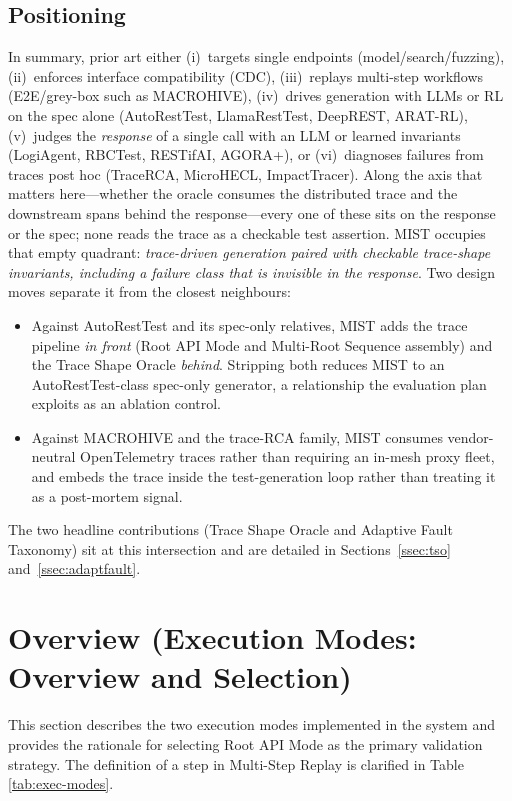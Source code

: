 \documentclass[conference]{IEEEtran}
\begin{document}
\subsection{Positioning}
In summary, prior art either (i)~targets single endpoints (model/search/fuzzing), (ii)~enforces interface compatibility (CDC), (iii)~replays multi-step workflows (E2E/grey-box such as MACROHIVE), (iv)~drives generation with LLMs or RL on the spec alone (AutoRestTest, LlamaRestTest, DeepREST, ARAT-RL), (v)~judges the \emph{response} of a single call with an LLM or learned invariants (LogiAgent, RBCTest, RESTifAI, AGORA+), or (vi)~diagnoses failures from traces post hoc (TraceRCA, MicroHECL, ImpactTracer).  Along the axis that matters here---whether the oracle consumes the distributed trace and the downstream spans behind the response---every one of these sits on the response or the spec; none reads the trace as a checkable test assertion.  \textsc{MIST} occupies that empty quadrant: \emph{trace-driven generation paired with checkable trace-shape invariants, including a failure class that is invisible in the response}.  Two design moves separate it from the closest neighbours:

\begin{itemize}[leftmargin=*]
  \item Against AutoRestTest and its spec-only relatives, \textsc{MIST}
        adds the trace pipeline \emph{in front} (Root API Mode and
        Multi-Root Sequence assembly) and the Trace Shape Oracle
        \emph{behind}.  Stripping both reduces \textsc{MIST} to an
        AutoRestTest-class spec-only generator, a relationship the
        evaluation plan exploits as an ablation control.
  \item Against MACROHIVE and the trace-RCA family, \textsc{MIST}
        consumes vendor-neutral OpenTelemetry traces rather than
        requiring an in-mesh proxy fleet, and embeds the trace inside
        the test-generation loop rather than treating it as a
        post-mortem signal.
\end{itemize}

The two headline contributions (Trace Shape Oracle and Adaptive Fault
Taxonomy) sit at this intersection and are detailed in
Sections~\ref{ssec:tso} and~\ref{ssec:adaptfault}.

\section{Overview (Execution Modes: Overview and Selection)}\label{sec:overview}
This section describes the two execution modes implemented in the system and provides the rationale for selecting Root API Mode as the primary validation strategy. The definition of a step in Multi-Step Replay is clarified in Table \ref{tab:exec-modes}.
\end{document}
